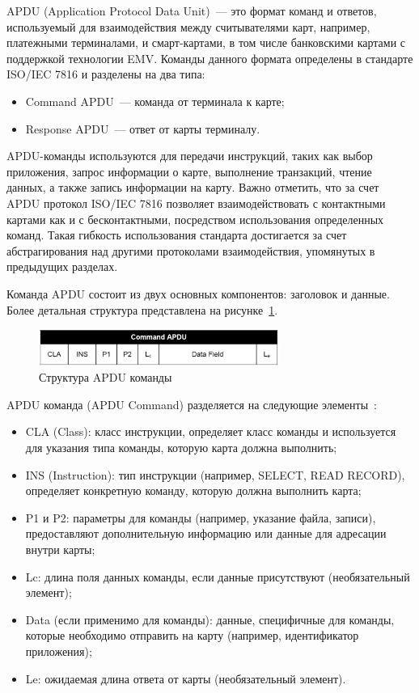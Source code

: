 APDU (Application Protocol Data Unit)~--- это формат команд и ответов, используемый для взаимодействия между считывателями карт, например, платежными терминалами, и смарт-картами, в том числе банковскими картами с поддержкой технологии EMV.
Команды данного формата определены в стандарте ISO/IEC 7816 и разделены на два типа:

\begin{itemize}
    \item Command APDU~--- команда от терминала к карте;
    \item Response APDU~--- ответ от карты терминалу.
\end{itemize}


APDU-команды используются для передачи инструкций, таких как выбор приложения, запрос информации о карте, выполнение транзакций, чтение данных, а также запись информации на карту.
Важно отметить, что за счет APDU протокол ISO/IEC 7816 позволяет взаимодействовать с контактными картами как и с бесконтактными, посредством использования определенных команд.
Такая гибкость использования стандарта достигается за счет абстрагирования над другими протоколами взаимодействия, упомянутых в предыдущих разделах.

Команда APDU состоит из двух основных компонентов: заголовок и данные.
Более детальная структура представлена на рисунке~\ref{fig:apdu_com}.

\begin{figure}[H]
    \centering
    \includegraphics[width=0.7\textwidth]{images/research/apdu_com}
    \caption{\centering Структура APDU команды}
    \label{fig:apdu_com}
\end{figure}


APDU команда (APDU Command) разделяется на следующие элементы~\cite{medium_apdu2}:

\begin{itemize}
    \item CLA (Class): класс инструкции, определяет класс команды и используется для указания типа команды, которую карта должна выполнить;
    \item INS (Instruction): тип инструкции (например, SELECT, READ RECORD), определяет конкретную команду, которую должна выполнить карта;
    \item P1 и P2: параметры для команды (например, указание файла, записи), предоставляют дополнительную информацию или данные для адресации внутри карты;
    \item Lc: длина поля данных команды, если данные присутствуют (необязательный элемент);
    \item  Data (если применимо для команды): данные, специфичные для команды, которые необходимо отправить на карту (например, идентификатор приложения);
    \item Le: ожидаемая длина ответа от карты (необязательный элемент).
\end{itemize}


